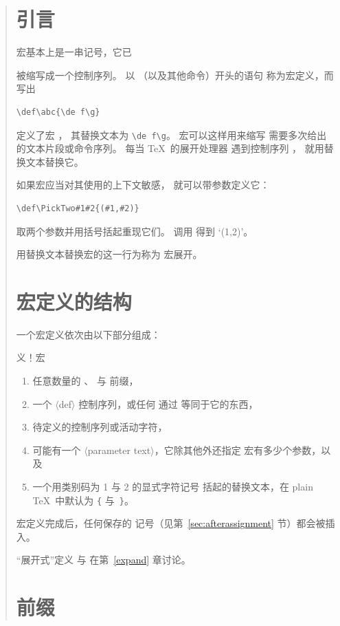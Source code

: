 \documentclass[a4paper]{rapport3}
\def\gr#1{$\langle$#1$\rangle$}\def\key#1{{\tt#1}}
\def\alt{}\def\altt{}%
\newenvironment{disp}{\begin{quotation}}{\end{quotation}}
\def\term#1\par{\index{#1}}
\begin{document}
\begin{disp}
\section{引言}

宏基本上是一串记号，它已
\term 宏\par
被缩写成一个控制序列。
以 （以及其他命令）开头的语句
称为{\italic 宏定义}\alt，而写出 \begin{verbatim}
\def\abc{\de f\g}
\end{verbatim}
定义了宏 ，
其{\italic 替换文本\/}为 \verb>\de f\g>。
宏可以这样用来缩写
需要多次给出的文本片段或命令序列。
每当 \TeX\ 的展开处理器
遇到控制序列 ，
就用替换文本替换它。

如果宏应当对其使用的上下文敏感，
就可以带参数定义它：
\begin{verbatim}
\def\PickTwo#1#2{(#1,#2)}
\end{verbatim}
取两个参数并用括号括起重现它们。
调用  得到 `(1,2)'。

用替换文本替换宏的这一行为称为
{\italic 宏展开}。

\section{宏定义的结构}

一个宏定义依次由以下部分组成：
\term 定义！宏\par
\begin{enumerate} \item 任意数量的 、
 与  前缀，
\item 一个 \gr{def} 控制序列，或任何
通过  等同于它的东西，
\item 待定义的控制序列或活动字符，
\item 可能有一个 \gr{parameter text}，它除其他外还指定
宏有多少个参数，以及
\item 一个用类别码为 1 与 2 的显式字符记号
括起的替换文本，在 plain \TeX\ 中默认为 \verb|{| 与~\verb|}|。
\end{enumerate}

宏定义完成后，任何保存的 
记号（见第~\ref{sec:afterassignment} 节）都会被插入。

“展开式”定义  与 
在第~\ref{expand} 章讨论。

\section{前缀}


\end{disp}
\end{document}
